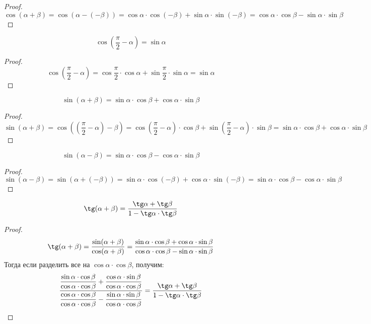\documentclass[12pt]{article}
\begin{document}
    \begin{proof}
        $$\cos(\alpha+\beta)=\cos(\alpha-(-\beta))=\cos\alpha\cdot\cos(-\beta)+\sin\alpha\cdot\sin(-\beta)=\cos\alpha\cdot\cos\beta-\sin\alpha\cdot\sin\beta$$
    \end{proof}
    \begin{statement}
        $$\cos\left(\dfrac{\pi}{2}-\alpha\right)=\sin \alpha$$
    \end{statement}
    \begin{proof}
        $$\cos\left(\dfrac{\pi}{2}-\alpha\right)=\cos\dfrac{\pi}{2}\cdot\cos\alpha+\sin\dfrac{\pi}{2}\cdot\sin\alpha=\sin\alpha$$
    \end{proof}
    \begin{statement}
        $$\sin(\alpha+\beta)=\sin\alpha\cdot\cos\beta+\cos\alpha\cdot\sin\beta$$
    \end{statement}
    \begin{proof}
        $$\sin(\alpha+\beta)=\cos\left(\left(\dfrac{\pi}{2}-\alpha\right)-\beta\right)=\cos\left(\dfrac{\pi}{2}-\alpha\right)\cdot \cos \beta+\sin\left(\dfrac{\pi}{2}-\alpha\right)\cdot \sin \beta=\sin\alpha\cdot\cos\beta+\cos\alpha\cdot\sin\beta$$
    \end{proof}
    \begin{statement}
        $$\sin(\alpha-\beta)=\sin\alpha\cdot\cos\beta-\cos\alpha\cdot\sin\beta$$
    \end{statement}
    \begin{proof}
        $$\sin(\alpha-\beta)=\sin(\alpha+(-\beta))=\sin\alpha\cdot\cos(-\beta)+\cos\alpha\cdot\sin(-\beta)=\sin\alpha\cdot\cos\beta-\cos\alpha\cdot\sin\beta$$
    \end{proof}
    \begin{statement}
        $$\tg(\alpha+\beta)=\dfrac{\tg\alpha+\tg\beta}{1-\tg\alpha\cdot\tg\beta}$$
    \end{statement}
    \begin{proof}
        $$\tg(\alpha+\beta)=\dfrac{\sin(\alpha+\beta)}{\cos(\alpha+\beta)}=\dfrac{\sin\alpha\cdot\cos\beta+\cos\alpha\cdot\sin\beta}{\cos\alpha\cdot\cos\beta-\sin\alpha\cdot\sin\beta}$$
        Тогда если разделить все на $\cos\alpha\cdot\cos\beta$, получим:
        $$\dfrac{\dfrac{\sin\alpha\cdot\cos\beta}{\cos\alpha\cdot\cos\beta}+\dfrac{\cos\alpha\cdot\sin\beta}{\cos\alpha\cdot\cos\beta}}{\dfrac{\cos\alpha\cdot\cos\beta}{\cos\alpha\cdot\cos\beta}-\dfrac{\sin\alpha\cdot\sin\beta}{\cos\alpha\cdot\cos\beta}}=\dfrac{\tg\alpha+\tg\beta}{1-\tg\alpha\cdot\tg\beta}$$
    \end{proof}
\end{document}

